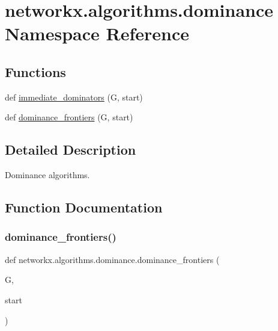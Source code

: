 \hypertarget{namespacenetworkx_1_1algorithms_1_1dominance}{}\section{networkx.\+algorithms.\+dominance Namespace Reference}
\label{namespacenetworkx_1_1algorithms_1_1dominance}
\subsection*{Functions}
\begin{DoxyCompactItemize}
\item 
def \hyperlink{namespacenetworkx_1_1algorithms_1_1dominance_a27ba6c00f9beb6723e8bee0dcd08ea4c}{immediate\+\_\+dominators} (G, start)
\item 
def \hyperlink{namespacenetworkx_1_1algorithms_1_1dominance_ad1b2df255d3a75d6633613dfcd0f4f0f}{dominance\+\_\+frontiers} (G, start)
\end{DoxyCompactItemize}


\subsection{Detailed Description}
\begin{DoxyVerb}Dominance algorithms.
\end{DoxyVerb}
 

\subsection{Function Documentation}
\mbox{\label{namespacenetworkx_1_1algorithms_1_1dominance_ad1b2df255d3a75d6633613dfcd0f4f0f}} 
\subsubsection{\texorpdfstring{dominance\+\_\+frontiers()}{dominance\_frontiers()}}
{\footnotesize\ttfamily def networkx.\+algorithms.\+dominance.\+dominance\+\_\+frontiers (\begin{DoxyParamCaption}\item[{}]{G,  }\item[{}]{start }\end{DoxyParamCaption})}

